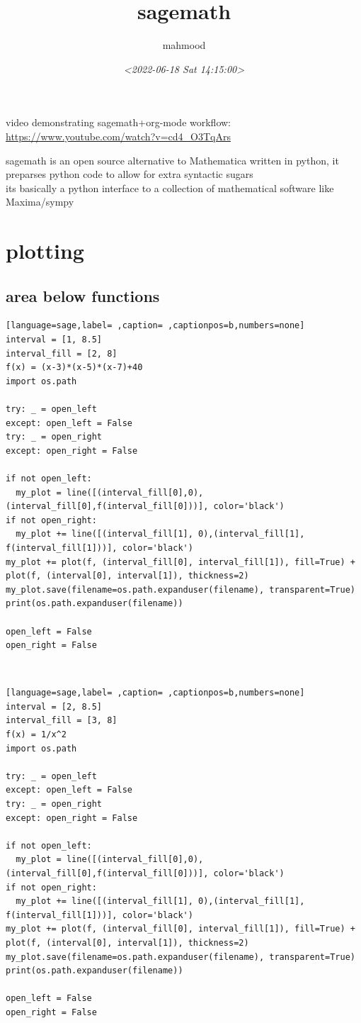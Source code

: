 \documentclass[a4paper,12pt]{article}
\author{mahmood}
\date{\textit{<2022-06-18 Sat 14:15:00>}}
\title{sagemath}
\begin{document}
\maketitle
\begin{note}
video demonstrating sagemath+org-mode workflow:\\[0pt]
\url{https://www.youtube.com/watch?v=cd4\_O3TqArs}\\[0pt]
\end{note}
sagemath is an open source alternative to Mathematica written in python, it preparses python code to allow for extra syntactic sugars\\[0pt]
its basically a python interface to a collection of mathematical software like Maxima/sympy\\[0pt]
\section{plotting}
\label{sec:orgd2dd39a}
\subsection{area below functions}
\label{sec:orgcadc4fb}
\begin{lstlisting}[language=sage,label= ,caption= ,captionpos=b,numbers=none]
interval = [1, 8.5]
interval_fill = [2, 8]
f(x) = (x-3)*(x-5)*(x-7)+40
import os.path

try: _ = open_left
except: open_left = False
try: _ = open_right
except: open_right = False

if not open_left:
  my_plot = line([(interval_fill[0],0),(interval_fill[0],f(interval_fill[0]))], color='black')
if not open_right:
  my_plot += line([(interval_fill[1], 0),(interval_fill[1], f(interval_fill[1]))], color='black')
my_plot += plot(f, (interval_fill[0], interval_fill[1]), fill=True) + plot(f, (interval[0], interval[1]), thickness=2)
my_plot.save(filename=os.path.expanduser(filename), transparent=True)
print(os.path.expanduser(filename))

open_left = False
open_right = False
\end{lstlisting}

\\[0pt]

\begin{lstlisting}[language=sage,label= ,caption= ,captionpos=b,numbers=none]
interval = [2, 8.5]
interval_fill = [3, 8]
f(x) = 1/x^2
import os.path

try: _ = open_left
except: open_left = False
try: _ = open_right
except: open_right = False

if not open_left:
  my_plot = line([(interval_fill[0],0),(interval_fill[0],f(interval_fill[0]))], color='black')
if not open_right:
  my_plot += line([(interval_fill[1], 0),(interval_fill[1], f(interval_fill[1]))], color='black')
my_plot += plot(f, (interval_fill[0], interval_fill[1]), fill=True) + plot(f, (interval[0], interval[1]), thickness=2)
my_plot.save(filename=os.path.expanduser(filename), transparent=True)
print(os.path.expanduser(filename))

open_left = False
open_right = False
\end{lstlisting}
\end{document}
